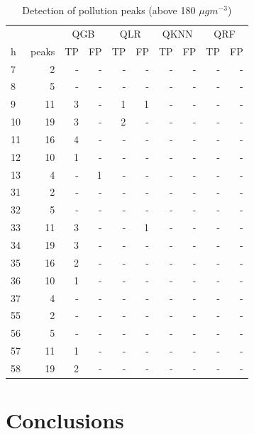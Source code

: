 \documentclass[a4paper,twocolumn,5p]{elsarticle}
\begin{document}
\begin{table}[tbp]
  \centering
  \caption{
    Detection of \no pollution peaks (above 180 $\mu gm^{-3}$)
    \label{table:classif_hig}
  }
  \begin{tabular}{lrrrrrrrrr}
    \toprule 
    \multicolumn{2}{c}{} & \multicolumn{2}{c}{QGB} & \multicolumn{2}{c}{QLR} & \multicolumn{2}{c}{QKNN} & \multicolumn{2}{c}{QRF}   \\
    h & peaks &  TP &  FP &  TP &  FP &  TP &  FP &  TP &  FP\\
    \midrule
    7  & 2 &- &   - &- &   - & - &    - &- &   - \\
    8  & 5 &- &   - &- &   - & - &    - &- &   - \\
    9  &11 & 3 &   - & 1 &   1 & - &    - &- &   - \\
    10 &19 & 3 &   - & 2 &   - & - &    - &- &   - \\
    11 &16 & 4 &   - &- &   - & - &    - &- &   - \\
    12 &10 & 1 &   - &- &   - & - &    - &- &   - \\
    13 & 4 &- &   1 &- &   - & - &    - &- &   - \\
    31 & 2 &- &   - &- &   - & - &    - &- &   - \\
    32 & 5 &- &   - &- &   - & - &    - &- &   - \\
    33 &11 & 3 &   - &- &   1 & - &    - &- &   - \\
    34 &19 & 3 &   - &- &   - & - &    - &- &   - \\
    35 &16 & 2 &   - &- &   - & - &    - &- &   - \\
    36 &10 & 1 &   - &- &   - & - &    - &- &   - \\
    37 & 4 &- &   - &- &   - & - &    - &- &   - \\
    55 & 2 &- &   - &- &   - & - &    - &- &   - \\
    56 & 5 &- &   - &- &   - & - &    - &- &   - \\
    57 &11 & 1 &   - &- &   - & - &    - &- &   - \\
    58 &19 & 2 &   - &- &   - & - &    - &- &   - \\
    \bottomrule
    \end{tabular}
\end{table}

\section{Conclusions}
\label{sec:concl}
\end{document}

